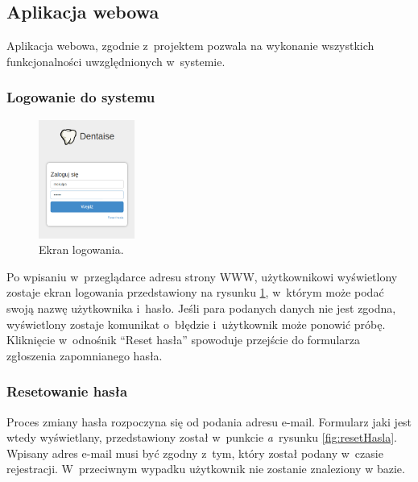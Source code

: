 \documentclass[11pt]{aghdpl}
\begin{document}
\subsection{Aplikacja webowa}

Aplikacja webowa, zgodnie z~projektem pozwala na wykonanie wszystkich funkcjonalności uwzględnionych w~systemie.

\subsubsection{Logowanie do systemu}

\begin{figure}
	\begin{center}
		\includegraphics[width=0.28\textwidth]{logowanie}
	\end{center}
	\caption{Ekran logowania.}
	\label{fig:logowanie}
\end{figure}

Po wpisaniu w~przeglądarce adresu strony WWW, użytkownikowi wyświetlony zostaje ekran logowania przedstawiony na rysunku \ref{fig:logowanie}, w~którym może podać swoją nazwę użytkownika i~hasło. Jeśli para podanych danych nie jest zgodna, wyświetlony zostaje komunikat o~błędzie i~użytkownik może ponowić próbę. Kliknięcie w~odnośnik ``Reset hasła'' spowoduje przejście do formularza zgłoszenia zapomnianego hasła.

\subsubsection{Resetowanie hasła}
\label{sec:resetowanieHaslaWidok}


Proces zmiany hasła rozpoczyna się od podania adresu e-mail. Formularz jaki jest wtedy wyświetlany, przedstawiony został w~punkcie \emph{a}~rysunku \ref{fig:resetHasla}. Wpisany adres e-mail musi być zgodny z~tym, który został podany w~czasie rejestracji. W~przeciwnym wypadku użytkownik nie zostanie znaleziony w bazie.
\end{document}

